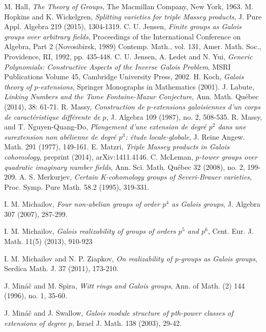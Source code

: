 \documentclass[12pt,leqno]{amsart}
\theoremstyle{plain}
\theoremstyle{definition}
\begin{document}
\begin{thebibliography}{999999999}
 M. Hall, {\it The Theory of Groups}, The Macmillan Company, New York, 1963.
 M. Hopkins and K. Wickelgren, {\it Splitting varieties for triple Massey products},  J. Pure Appl. Algebra 219 (2015), 1304-1319.
 C. U. Jensen, {\it Finite groups as Galois groups over arbitrary fields}, Proceedings of the International Conference on Algebra, Part 2 (Novosibirsk, 1989) Contemp. Math., vol. 131, Amer. Math. Soc., Providence, RI, 1992, pp. 435-448. 
 C. U. Jensen, A. Ledet and N. Yui, {\it Generic Polynomials: Constructive Aspects of the Inverse Galois Problem}, MSRI Publications Volume 45, Cambridge University Press, 2002.
 H. Koch, {\it Galois theory of $p$-extensions}, Springer Monographs in Mathematics (2001).
 J. Labute,  {\it Linking Numbers and the Tame Fontaine-Mazur Conjecture}, Ann. Math. Qu\'ebec (2014), 38: 61-71.
 R. Massy, {\it Construction de $p$-extensions galoisiennes d'un corps de caract\'eristique diff\'erente de $p$}, J. Algebra 109 (1987), no. 2, 508-535.
 R. Massy, and T. Nguyen-Quang-Do, {\it Plongement d'une extension de degr\'e $p^2$ dans une surextension non ab\'elienne de degr\'e $p^3$: \'etude locale-globale}, J. Reine Angew. Math. 291 (1977), 149-161.
 E. Matzri, {\it Triple Massey products in Galois cohomology}, preprint (2014), arXiv:1411.4146.
 C. McLeman, {\it $p$-tower groups over quadratic imaginary number fields}, Ann. Sci. Math. Qu\'ebec 32 (2008), no. 2, 199-209.
 A. S. Merkurjev, {\it  Certain K-cohomology groups of Severi-Brauer varieties}, Proc. Symp. Pure Math. 58.2 (1995), 319-331.

 I. M. Michailov, {\it Four non-abelian groups of order $p^4$ as Galois groups}, J. Algebra 307 (2007), 287-299.

 I. M. Michailov, {\it Galois realizability of groups of orders $p^5$ and $p^6$}, Cent. Eur. J. Math. 11(5) (2013), 910-923

 I. M. Michailov and N. P. Ziapkov, {\it On realizability of p-groups as Galois groups}, Serdica Math. J. 37 (2011), 173-210.

 J. Min\'a\v{c} and M. Spira, {\it Witt rings and Galois groups}, Ann. of Math. (2) 144 (1996), no. 1, 35-60.

 J. Min\'a\v{c} and J. Swallow, {\it Galois module structure of $p$th-power classes of extensions of degree $p$}, Israel J. Math. 138 (2003), 29-42. 


\end{thebibliography}
\end{document}
